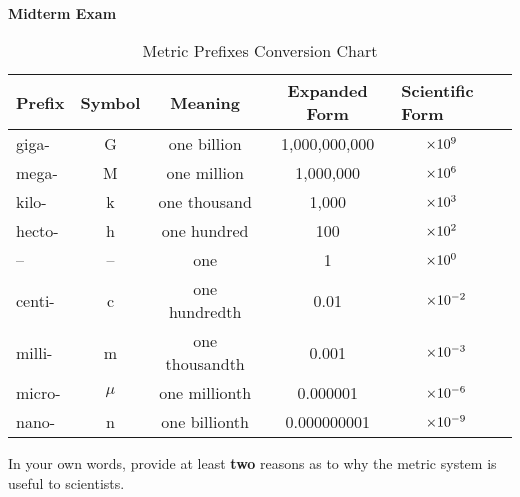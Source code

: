 
\addpoints
\printanswers




\begin{centering}
\noindent\textbf{\\\Large Midterm Exam\\} 
\end{centering}

\qsp
{}
\qsp


\begin{table}[h!]
\centering

\begin{tabular}{l c c c l}
\toprule
\textbf{Prefix} & \textbf{Symbol} & \textbf{Meaning} & \textbf{Expanded Form} & \textbf{Scientific Form}\\
\midrule
giga- & G & one billion & 1,000,000,000 & $\hspace{4ex}\times 10^{9}$\\ 
mega- & M & one million & 1,000,000 & $\hspace{4ex}\times 10^{6}$\\ 
kilo- & k & one thousand & 1,000 & $\hspace{4ex}\times 10^{3}$\\ 
hecto- & h & one hundred & 100 & $\hspace{4ex}\times 10^{2}$\\ 
-- & -- & one & 1 & $\hspace{4ex}\times 10^{0}$\\ 
centi- & c & one hundredth & 0.01 & $\hspace{4ex}\times 10^{-2}$\\ 
milli- & m & one thousandth & 0.001 & $\hspace{4ex}\times 10^{-3}$\\ 
micro- & $\mu$ & one millionth & 0.000001 & $\hspace{4ex}\times 10^{-6}$\\ 
nano- & n & one billionth & 0.000000001 & $\hspace{4ex}\times 10^{-9}$\\ 
\bottomrule
\end{tabular}
\captionsetup{font=small, labelfont=bf}
\caption{Metric Prefixes Conversion Chart}
\end{table}

\begin{questions}

\question[1] In your own words, provide at least \textbf{two} reasons as to why the metric system is useful to scientists.  

\newpage
{}
\qsp

\newpage
{}


\newpage
{}


\end{questions}



